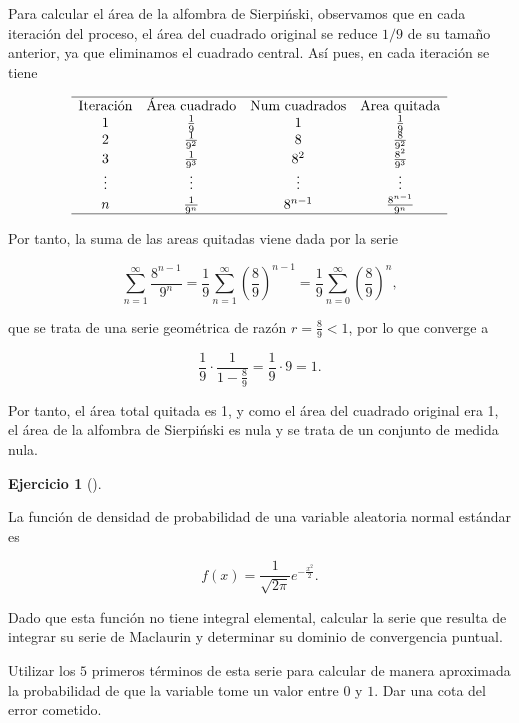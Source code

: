 \documentclass[
  spanish,
  a4paper,
]{scrreport}
\theoremstyle{definition}
\newtheorem{exercise}{Ejercicio}[chapter]
\theoremstyle{remark}
\begin{document}
\begin{tcolorbox}[enhanced jigsaw, arc=.35mm, bottomrule=.15mm, bottomtitle=1mm, breakable, colback=white, colbacktitle=quarto-callout-tip-color!10!white, colframe=quarto-callout-tip-color-frame, coltitle=black, left=2mm, leftrule=.75mm, opacityback=0, opacitybacktitle=0.6, rightrule=.15mm, title=\textcolor{quarto-callout-tip-color}{\faLightbulb}\hspace{0.5em}{Solución}, titlerule=0mm, toprule=.15mm, toptitle=1mm]

Para calcular el área de la alfombra de Sierpiński, observamos que en
cada iteración del proceso, el área del cuadrado original se reduce
\(1/9\) de su tamaño anterior, ya que eliminamos el cuadrado central.
Así pues, en cada iteración se tiene

\[
\begin{array}{cccc}
\hline
\mbox{Iteración} & \mbox{Área cuadrado} & \mbox{Num cuadrados} & \mbox{Area quitada} \\
1 & \frac{1}{9} & 1 & \frac{1}{9} \\
2 & \frac{1}{9^2} & 8 & \frac{8}{9^2} \\
3 & \frac{1}{9^3} & 8^2 & \frac{8^2}{9^3} \\
\vdots & \vdots & \vdots & \vdots \\
n & \frac{1}{9^n} & 8^{n-1} & \frac{8^{n-1}}{9^n} \\
\hline
\end{array}
\]

Por tanto, la suma de las areas quitadas viene dada por la serie

\[
\sum_{n=1}^\infty \frac{8^{n-1}}{9^n} 
= \frac{1}{9}\sum_{n=1}^\infty \left(\frac{8}{9}\right)^{n-1}
= \frac{1}{9}\sum_{n=0}^\infty \left(\frac{8}{9}\right)^n,
\]

que se trata de una serie geométrica de razón \(r = \frac{8}{9} < 1\),
por lo que converge a

\[
\frac{1}{9} \cdot \frac{1}{1 - \frac{8}{9}} = \frac{1}{9} \cdot 9 = 1.
\]

Por tanto, el área total quitada es 1, y como el área del cuadrado
original era 1, el área de la alfombra de Sierpiński es nula y se trata
de un conjunto de medida nula.

\end{tcolorbox}

\begin{exercise}[]\protect\hypertarget{exr-6}{}\label{exr-6}

La función de densidad de probabilidad de una variable aleatoria normal
estándar es

\[
f(x) = \frac{1}{\sqrt{2\pi}}e^{-\frac{x^2}{2}}.
\]

Dado que esta función no tiene integral elemental, calcular la serie que
resulta de integrar su serie de Maclaurin y determinar su dominio de
convergencia puntual.

Utilizar los \(5\) primeros términos de esta serie para calcular de
manera aproximada la probabilidad de que la variable tome un valor entre
\(0\) y \(1\). Dar una cota del error cometido.

\end{exercise}
\end{document}
